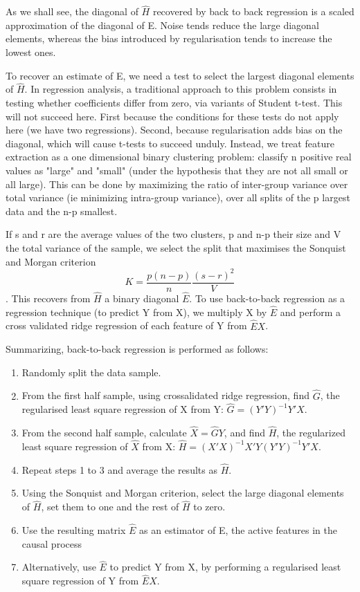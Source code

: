\documentclass{article}
\begin{document}
As we shall see, the diagonal of $\hat H$ recovered by back to back regression is a scaled approximation of the diagonal of E. Noise tends reduce the large diagonal elements, whereas the bias introduced by regularisation tends to increase the lowest ones.

To recover an estimate of E, we need a test to select the largest diagonal elements of $\hat H$.
%
In regression analysis, a traditional approach to this problem consists in testing whether coefficients differ from zero, via variants of Student t-test.
%
This will not succeed here. First because the conditions for these tests do not apply here (we have two regressions). Second, because regularisation adds bias on the diagonal, which will cause t-tests to succeed unduly.
%
Instead, we treat feature extraction as a one dimensional binary clustering problem: classify n positive real values as "large" and "small" (under the hypothesis that they are not all small or all large). This can be done by maximizing the ratio of inter-group variance over total variance (ie minimizing intra-group variance), over all splits of the p largest data and the n-p smallest. 

If s and r are the average values of the two clusters, p and n-p their size and V the total variance of the sample, we select the split that maximises the Sonquist and Morgan criterion $$K = \frac{p (n-p)}{n} \frac{(s-r)^2}{ V}$$.
%
This recovers from $\hat H$ a binary diagonal $\hat E$.
%
To use back-to-back regression as a regression technique (to predict Y from X), we multiply X by $\hat E$ and perform a cross validated ridge regression of each feature of Y from $\hat E X$.

Summarizing, back-to-back regression is performed as follows:
\begin{enumerate}
\item Randomly split the data sample.
\item From the first half sample, using crossalidated ridge regression, find $\hat G$, the regularised least square regression of X from Y: $\hat G=(Y'Y)^{-1} Y'X$.
\item From the second half sample, calculate $\hat X = \hat G Y$, and find $\hat H$, the regularized least square regression of $\hat X$ from X: $\hat H=(X'X)^{-1} X'Y(Y'Y)^{-1} Y'X$.
\item Repeat steps 1 to 3 and average the results as $\hat H$.
\item Using the Sonquist and Morgan criterion, select the large diagonal elements of $\hat H$, set them to one and the rest of $\hat  H$ to zero.
\item Use the resulting matrix $\hat E$ as an estimator of E, the active features in the causal process
\item Alternatively, use $\hat E$ to predict Y from X, by performing a regularised least square regression of Y from $\hat E X$.
%

\end{enumerate}
\end{document}
